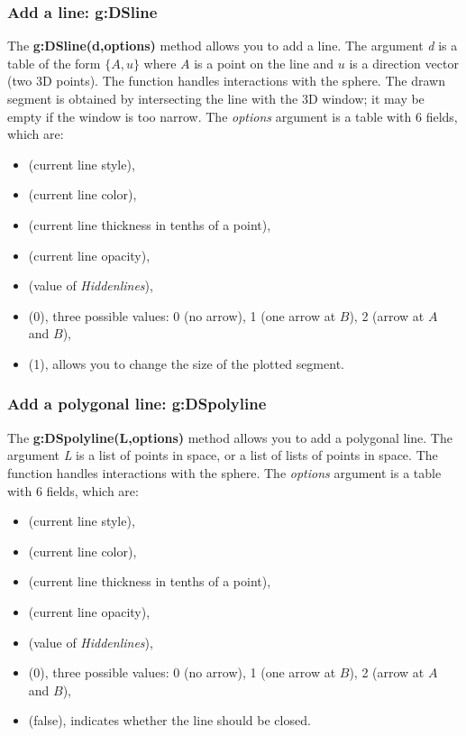 \subsubsection{Add a line: g:DSline}

The \textbf{g:DSline(d,options)} method allows you to add a line. The argument \emph{d} is a table of the form $\{A,u\}$ where $A$ is a point on the line and $u$ is a direction vector (two 3D points). The function handles interactions with the sphere. The drawn segment is obtained by intersecting the line with the 3D window; it may be empty if the window is too narrow. The \emph{options} argument is a table with 6 fields, which are:
\begin{itemize}
    \item {} (current line style),
    \item {} (current line color),
    \item {} (current line thickness in tenths of a point),
    \item {} (current line opacity),
    \item {} (value of \emph{Hiddenlines}),
    \item {} (0), three possible values: 0 (no arrow), 1 (one arrow at $B$), 2 (arrow at $A$ and $B$),
    \item {} (1), allows you to change the size of the plotted segment.
\end{itemize}

    
\subsubsection{ Add a polygonal line: g:DSpolyline}

The \textbf{g:DSpolyline(L,options)} method allows you to add a polygonal line. The argument \emph{L} is a list of points in space, or a list of lists of points in space. The function handles interactions with the sphere. The \emph{options} argument is a table with 6 fields, which are:
\begin{itemize}
    \item {} (current line style),
    \item {} (current line color),
    \item {} (current line thickness in tenths of a point),
    \item {} (current line opacity),
    \item {} (value of \emph{Hiddenlines}),
    \item {} (0), three possible values: 0 (no arrow), 1 (one arrow at $B$), 2 (arrow at $A$ and $B$),
    \item {} (false), indicates whether the line should be closed. \end{itemize}

